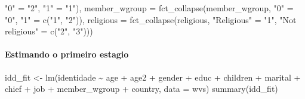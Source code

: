 \documentclass[
]{article}
\newenvironment{Shaded}{\begin{snugshade}}{\end{snugshade}}
\newcommand{\AttributeTok}[1]{\textcolor[rgb]{0.77,0.63,0.00}{#1}}
\newcommand{\FunctionTok}[1]{\textcolor[rgb]{0.00,0.00,0.00}{#1}}
\newcommand{\NormalTok}[1]{#1}
\newcommand{\OtherTok}[1]{\textcolor[rgb]{0.56,0.35,0.01}{#1}}
\newcommand{\SpecialCharTok}[1]{\textcolor[rgb]{0.00,0.00,0.00}{#1}}
\newcommand{\StringTok}[1]{\textcolor[rgb]{0.31,0.60,0.02}{#1}}
\begin{document}
\begin{Shaded}
\begin{Highlighting}[]
                            \StringTok{"0"} \OtherTok{=} \StringTok{"2"}\NormalTok{,}
                            \StringTok{"1"} \OtherTok{=} \StringTok{"1"}\NormalTok{),}
         \AttributeTok{member\_wgroup =} \FunctionTok{fct\_collapse}\NormalTok{(member\_wgroup,}
                                      \StringTok{"0"} \OtherTok{=} \StringTok{"0"}\NormalTok{,}
                                      \StringTok{"1"} \OtherTok{=} \FunctionTok{c}\NormalTok{(}\StringTok{"1"}\NormalTok{, }\StringTok{"2"}\NormalTok{)),}
         \AttributeTok{religious =} \FunctionTok{fct\_collapse}\NormalTok{(religious,}
                                  \StringTok{"Religious"} \OtherTok{=} \StringTok{"1"}\NormalTok{,}
                                  \StringTok{"Not religious"} \OtherTok{=} \FunctionTok{c}\NormalTok{(}\StringTok{"2"}\NormalTok{, }\StringTok{"3"}\NormalTok{)))}
\end{Highlighting}
\end{Shaded}

\hypertarget{estimando-o-primeiro-estagio}{%
\paragraph{Estimando o primeiro
estagio}\label{estimando-o-primeiro-estagio}}

\begin{Shaded}
\begin{Highlighting}[]
\NormalTok{idd\_fit }\OtherTok{\textless{}{-}} \FunctionTok{lm}\NormalTok{(identidade }\SpecialCharTok{\textasciitilde{}}\NormalTok{ age }\SpecialCharTok{+}\NormalTok{ age2 }\SpecialCharTok{+}\NormalTok{ gender }\SpecialCharTok{+}\NormalTok{ educ }\SpecialCharTok{+}\NormalTok{ children }\SpecialCharTok{+}\NormalTok{ marital }\SpecialCharTok{+} 
\NormalTok{                           chief }\SpecialCharTok{+}\NormalTok{ job }\SpecialCharTok{+}\NormalTok{ member\_wgroup }\SpecialCharTok{+}\NormalTok{ country,}
              \AttributeTok{data =}\NormalTok{ wvs)}
\FunctionTok{summary}\NormalTok{(idd\_fit)}
\end{Highlighting}
\end{Shaded}
\end{document}
